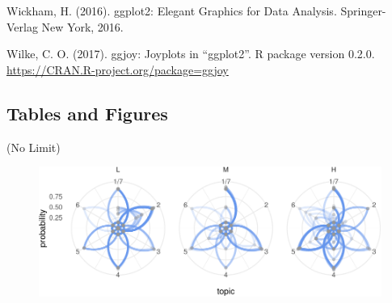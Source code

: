 \documentclass[doc]{apa6}
\theoremstyle{definition}
\theoremstyle{definition}
\theoremstyle{definition}
\theoremstyle{remark}
\begin{document}
Wickham, H. (2016). ggplot2: Elegant Graphics for Data Analysis.
Springer-Verlag New York, 2016.

Wilke, C. O. (2017). ggjoy: Joyplots in \enquote{ggplot2}. R package
version 0.2.0. \url{https://CRAN.R-project.org/package=ggjoy}

\subsection{Tables and Figures}\label{tables-and-figures}

(No Limit)

\begin{figure}
\centering
\includegraphics{ncme19_files/figure-latex/modeling-1.pdf}
\caption{}
\end{figure}
\end{document}
